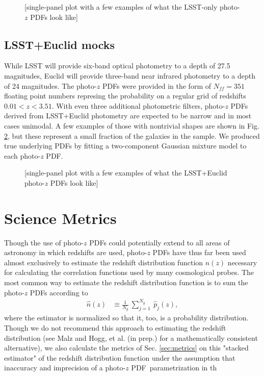 \documentclass[\docopts]{\docclass}
\newcommand{\pz}{photo-$z$ PDF}
\begin{document}
\begin{figure}
  \caption{[single-panel plot with a few examples of what the LSST-only \pz s 
look like]
  \label{fig:ss}}
\end{figure}

\subsection{LSST+Euclid mocks}
\label{sec:mg}


While LSST will provide six-band optical photometry to a depth of 27.5 
magnitudes, Euclid will provide three-band near infrared photometry to a depth 
of 24 magnitudes.  The \pz s were provided in the form of $N_{ff}=351$ floating 
point numbers represing the probability on a regular grid of redshifts $0.01 < 
z < 3.51$.  With even three additional photometric filters, \pz s derived from 
LSST+Euclid photometry are expected to be narrow and in most cases unimodal.  A 
few examples of those with nontrivial shapes are shown in Fig. \ref{fig:mg}, 
but these represent a small fraction of the galaxies in the sample.  We 
produced true underlying PDFs by fitting a two-component Gaussian mixture model 
to each \pz.

\begin{figure}
  \caption{[single-panel plot with a few examples of what the LSST+Euclid \pz s 
look like]
  \label{fig:mg}}
\end{figure}


\section{Science Metrics}
\label{sec:science}

Though the use of \pz s could potentially extend to all areas of astronomy in 
which redshifts are used, \pz s have thus far been used almost exclusively to 
estimate the redshift distribution function $n(z)$ necessary for calculating 
the correlation functions used by many cosmological probes.
The most common way to estimate the redshift distribution function is to sum 
the \pz s according to
\begin{align}
  \label{eq:nz}
  \hat{n}(z) &\equiv \frac{1}{N_{g}}\ \sum_{j=1}^{N_{g}}\ \hat{p}_{j}(z),
\end{align}
where the estimator is normalized so that it, too, is a probability 
distribution.  Though we do not recommend this approach to estimating the 
redshift distribution (see Malz and Hogg, et al. (in prep.) for a 
mathematically consistent alternative), we also calculate the metrics of Sec. 
\ref{sec:metrics} on this "stacked estimator" of the redshift distribution 
function under the assumption that inaccuracy and imprecision of a \pz\ 
parametrization in th
\end{document}
